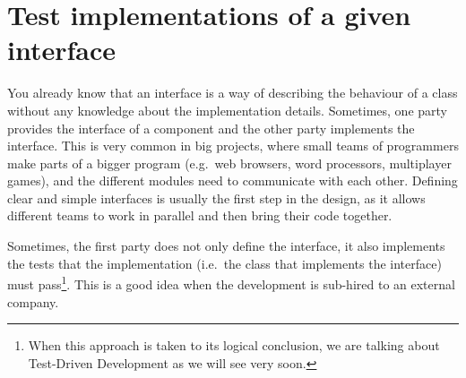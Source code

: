 \documentclass{article}
\begin{document}




\section{Test implementations of a given interface}
\label{sec:test-impl-given}

You already know that an interface is a way of describing the
behaviour of a class without any knowledge about the implementation 
details. Sometimes, one
party provides the interface of a component and the other party
implements the interface. This is very common in big projects, where
small teams of programmers make parts of a bigger program (e.g.~web
browsers, word processors, multiplayer games), and the different
modules need to communicate with each other. Defining clear and simple
interfaces is usually the first step in the design, as it allows
different teams to work in parallel and then bring their code
together. 

Sometimes, the first party does not only define the interface, it also
implements the tests that the implementation (i.e.~the class that
implements the interface) must pass\footnote{When this approach is taken to
its logical conclusion, we are talking about Test-Driven Development
as we will see very soon.}. This is a good idea when the development is
sub-hired to an external company. 
\end{document}
